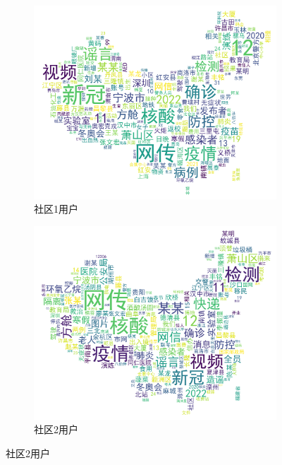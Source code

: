 \documentclass[UTF8]{ctexart}
\begin{document}
\begin{figure}[!ht]
    \begin{subfigure}[b]{0.3\textwidth}
         \centering
         \includegraphics[width=\textwidth]{../figures/wordcloud_user_1}
         \caption{社区1用户}
         \label{subfig:wordcloud_user_1}
     \end{subfigure}
     \hfill
     \begin{subfigure}[b]{0.3\textwidth}
         \centering
         \includegraphics[width=\textwidth]{../figures/wordcloud_user_2}
         \caption{社区2用户}
         \label{subfig:wordcloud_user_2}
     \end{subfigure}

\end{figure}
\end{document}
